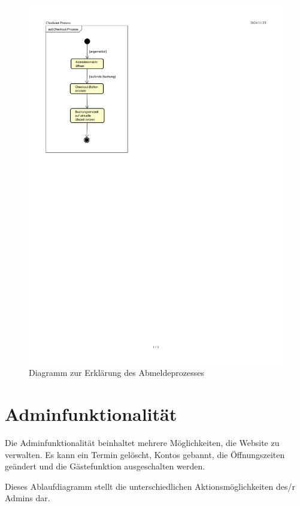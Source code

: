 \begin{figure}[ht]
    \centering
    \includegraphics[width=\textwidth]{figures/activity/checkoutprozess}
    \caption{Diagramm zur Erklärung des Abmeldeprozesses}
    \label{fig:logout-diagram}
\end{figure}
\clearpage

\section{Adminfunktionalität}

Die Adminfunktionalität beinhaltet mehrere Möglichkeiten, die Website zu verwalten.
Es kann ein Termin gelöscht, Kontos gebannt, die Öffnungszeiten geändert und die Gästefunktion
ausgeschalten werden.

Dieses Ablaufdiagramm stellt die unterschiedlichen Aktionsmöglichkeiten des/r Admins dar.


